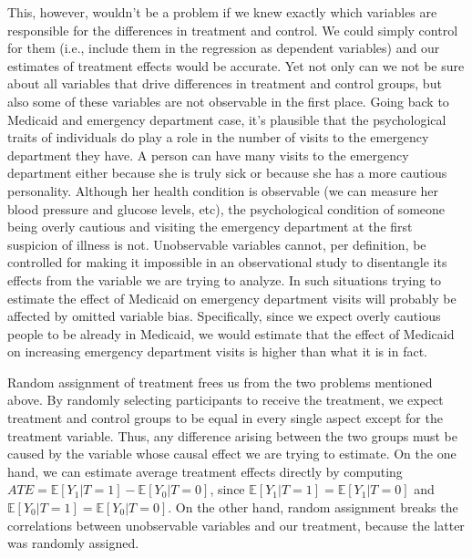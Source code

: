 This, however, wouldn't be a problem if we knew exactly which variables are responsible for the differences in treatment and control. We could simply control for them (i.e., include them in the regression as dependent variables) and our estimates of treatment effects would be accurate. Yet not only can we not be sure about all variables that drive differences in treatment and control groups, but also some of these variables are not observable in the first place. Going back to Medicaid and emergency department case, it's plausible that the psychological traits of individuals do play a role in the number of visits to the emergency department they have. A person can have many visits to the emergency department either because she is truly sick or because she has a more cautious personality. Although her health condition is observable (we can measure her blood pressure and glucose levels, etc), the psychological condition of someone being overly cautious and visiting the emergency department at the first suspicion of illness is not. Unobservable variables cannot, per definition, be controlled for making it impossible in an observational study to disentangle its effects from the variable we are trying to analyze. In such situations trying to estimate the effect of Medicaid on emergency department visits will probably be affected by omitted variable bias. Specifically, since we expect overly cautious people to be already in Medicaid, we would estimate that the effect of Medicaid on increasing emergency department visits is higher than what it is in fact.

Random assignment of treatment frees us from the two problems mentioned above. By randomly selecting participants to receive the treatment, we expect treatment and control groups to be equal in every single aspect except for the treatment variable. Thus, any difference arising between the two groups must be caused by the variable whose causal effect we are trying to estimate. On the one hand, we can estimate average treatment effects directly by computing $ATE = \mathbb{E}[Y_1 | T = 1] - \mathbb{E}[Y_0 | T = 0]$, since $\mathbb{E}[Y_1 | T = 1] = \mathbb{E}[Y_1 | T = 0]$ and $\mathbb{E}[Y_0 | T = 1] = \mathbb{E}[Y_0 | T = 0]$. On the other hand, random assignment breaks the correlations between unobservable variables and our treatment, because the latter was randomly assigned.

